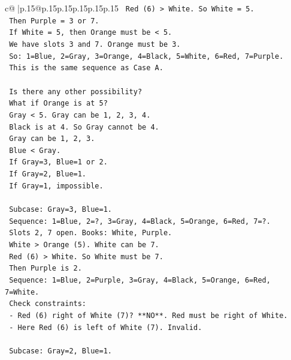 \documentclass{article}
\begin{document}
{\begin{supertabular}{c@{$\;$}|p{.15\linewidth}@{}p{.15\linewidth}p{.15\linewidth}p{.15\linewidth}p{.15\linewidth}p{.15\linewidth}}
{{{\texttt{          Red (6) > White. So White = 5.} \\
\texttt{          Then Purple = 3 or 7.} \\
\texttt{          If White = 5, then Orange must be < 5.} \\
\texttt{          We have slots 3 and 7. Orange must be 3.} \\
\texttt{          So: 1=Blue, 2=Gray, 3=Orange, 4=Black, 5=White, 6=Red, 7=Purple.} \\
\texttt{          This is the same sequence as Case A.} \\
\\ 
\texttt{    Is there any other possibility?} \\
\texttt{    What if Orange is at 5?} \\
\texttt{       Gray < 5. Gray can be 1, 2, 3, 4.} \\
\texttt{       Black is at 4. So Gray cannot be 4.} \\
\texttt{       Gray can be 1, 2, 3.} \\
\texttt{       Blue < Gray.} \\
\texttt{       If Gray=3, Blue=1 or 2.} \\
\texttt{       If Gray=2, Blue=1.} \\
\texttt{       If Gray=1, impossible.} \\
\\ 
\texttt{       Subcase: Gray=3, Blue=1.} \\
\texttt{          Sequence: 1=Blue, 2=?, 3=Gray, 4=Black, 5=Orange, 6=Red, 7=?.} \\
\texttt{          Slots 2, 7 open. Books: White, Purple.} \\
\texttt{          White > Orange (5). White can be 7.} \\
\texttt{          Red (6) > White. So White must be 7.} \\
\texttt{          Then Purple is 2.} \\
\texttt{          Sequence: 1=Blue, 2=Purple, 3=Gray, 4=Black, 5=Orange, 6=Red, 7=White.} \\
\texttt{          Check constraints:} \\
\texttt{          {-} Red (6) right of White (7)? **NO**. Red must be right of White.} \\
\texttt{          {-} Here Red (6) is left of White (7). Invalid.} \\
\\ 
\texttt{       Subcase: Gray=2, Blue=1.} \\
}}}
\end{supertabular}}
\end{document}
